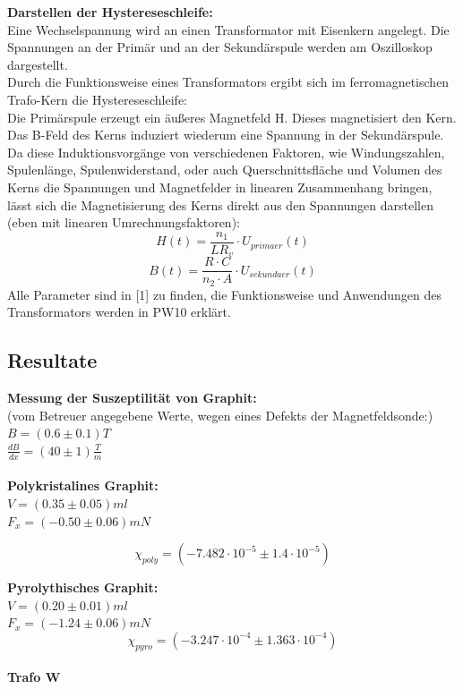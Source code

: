 \documentclass[12pt,a4paper]{article}
\begin{document}
\begin{multicols}{2}
\noindent \textbf{Darstellen der Hystereseschleife:}\\
Eine Wechselspannung wird an einen Transformator mit Eisenkern angelegt. Die Spannungen an der Primär und an der Sekundärspule werden am Oszilloskop dargestellt.\\
Durch die Funktionsweise eines Transformators ergibt sich im ferromagnetischen Trafo-Kern die Hystereseschleife:\\
Die Primärspule erzeugt ein äußeres Magnetfeld H. Dieses magnetisiert den Kern. Das B-Feld des Kerns induziert wiederum eine Spannung in der Sekundärspule.\\
Da diese Induktionsvorgänge von verschiedenen Faktoren, wie Windungszahlen, Spulenlänge, Spulenwiderstand, oder auch Querschnittsfläche und Volumen des Kerns die Spannungen und Magnetfelder in linearen Zusammenhang bringen, lässt sich die Magnetisierung des Kerns direkt aus den Spannungen darstellen (eben mit linearen Umrechnungsfaktoren):
$$H(t) = \frac{n_1}{L R_v}\cdot U_{primaer}(t)$$
$$B(t)= \frac{R\cdot C}{n_2 \cdot A} \cdot U_{sekundaer}(t)$$
Alle Parameter sind in [1] zu finden, die Funktionsweise und Anwendungen des Transformators werden in PW10 erklärt.
\pagebreak
\subsection{Resultate}
\textbf{Messung der Suszeptilität von Graphit:}\\
(vom Betreuer angegebene Werte, wegen eines Defekts der Magnetfeldsonde:)\\
$B = (0.6 \pm 0.1)T$\\
$\frac{dB}{dx} = (40 \pm 1) \frac{T}{m}$\\
\\
\textbf{Polykristalines Graphit:}\\
$V=(0.35 \pm 0.05) ml$\\
$F_x=(-0.50 \pm 0.06)mN$

$$\chi_{poly} = (-7.482 \cdot 10^{-5} \pm 1.4 \cdot 10^{-5})$$

\textbf{Pyrolythisches Graphit:}\\
$V=(0.20 \pm 0.01) ml$\\
$F_x=(-1.24 \pm 0.06)mN$
$$\chi_{pyro} = (-3.247 \cdot 10^{-4} \pm 1.363 \cdot 10^{-4})$$
\\
\noindent
\textbf{Trafo W}\\

\end{multicols}
\end{document}
